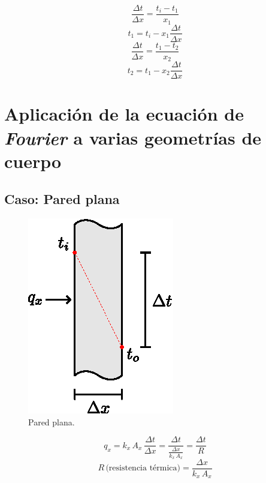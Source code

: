 \begin{equation*}
    \frac{\Delta t}{\Delta x}=\frac{t_i-t_1}{x_1}
\end{equation*}
\begin{equation}
    t_1=t_i-x_1\frac{\Delta t}{\Delta x}
\end{equation}
\begin{equation*}
    \frac{\Delta t}{\Delta x}=\frac{t_1-t_2}{x_2}
\end{equation*}
\begin{equation}
    t_2=t_1-x_2\frac{\Delta t}{\Delta x}
\end{equation}

\section{Aplicación de la ecuación de \emph{Fourier} a varias geometrías de
cuerpo}

\subsection{Caso: Pared plana}
\begin{figure}[!h]
\centering
\includegraphics[scale=1.20]{figura02_05.eps}
\caption{Pared plana.}
\end{figure}

\begin{equation*}
    q_x
    =k_x\,A_x\,\frac{\Delta t}{\Delta x}
    =\frac{\Delta t}{\frac{\Delta x}{k_x\,A_x}}
    =\frac{\Delta t}{R}
\end{equation*}
\begin{equation*}
    R\,\text{(resistencia térmica)}=\frac{\Delta x}{k_x\,A_x}
\end{equation*}

